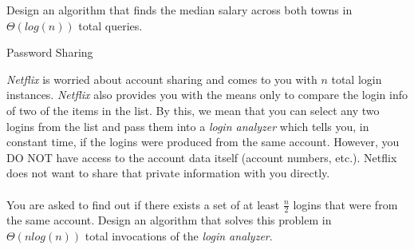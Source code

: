 \documentclass[10pt]{article}
\begin{document}
Design an algorithm that finds the median salary across both towns in $\Theta(log(n))$ total queries.

\solution{
}



\begin{problem} Password Sharing \end{problem}

\emph{Netflix} is worried about account sharing and comes to you with $n$ total login instances. \emph{Netflix} also provides you with the means only to compare the login info of two of the items in the list. By this, we mean that you can select any two logins from the list and pass them into a \emph{login analyzer} which tells you, in constant time, if the logins were produced from the same account. However, you DO NOT have access to the account data itself (account numbers, etc.). Netflix does not want to share that private information with you directly.\\
\\
You are asked to find out if there exists a set of at least $\frac{n}{2}$ logins that were from the same account. Design an algorithm that solves this problem in $\Theta(nlog(n))$ total invocations of the \emph{login analyzer}.


\solution{
}







\end{document}
